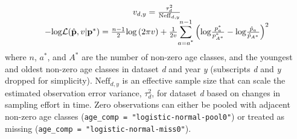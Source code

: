 \documentclass[]{article}
\begin{document}
\begin{equation*}
  \begin{array}{ccc}
    v_{d,y} = \frac{\tau^2_d}{\mathrm{Neff}_{d,y}} \\
    -\mathrm{log}\mathcal{L}(\hat{\mathbf{p}},v|\mathbf{p}^{*}) = \frac{n-1}{2}\mathrm{log}\left(2\pi v\right) + \frac{1}{2v} \mathlarger{\sum}_{a=a^{*}}^{n-1} \left(\mathrm{log} \frac{p^{*}_{a}}{p^{*}_{A^{*}}} - \mathrm{log} \frac{\hat{p}_{a}}{\hat{p}_{A^{*}}}\right)^2
  \end{array}
\end{equation*} where \(n\), \(a^{*}\), and \(A^{*}\) are the number of
non-zero age classes, and the youngest and oldest non-zero age classes
in dataset \emph{d} and year \emph{y} (subscripts \emph{d} and \emph{y}
dropped for simplicity). \(\mathrm{Neff}_{d,y}\) is an effective sample
size that can scale the estimated observation error variance,
\(\tau^2_d\), for dataset \emph{d} based on changes in sampling effort
in time. Zero observations can either be pooled with adjacent non-zero
age classes (\texttt{age\_comp\ =\ "logistic-normal-pool0"}) or treated
as missing (\texttt{age\_comp\ =\ "logistic-normal-miss0"}).

\pagebreak
\end{document}
